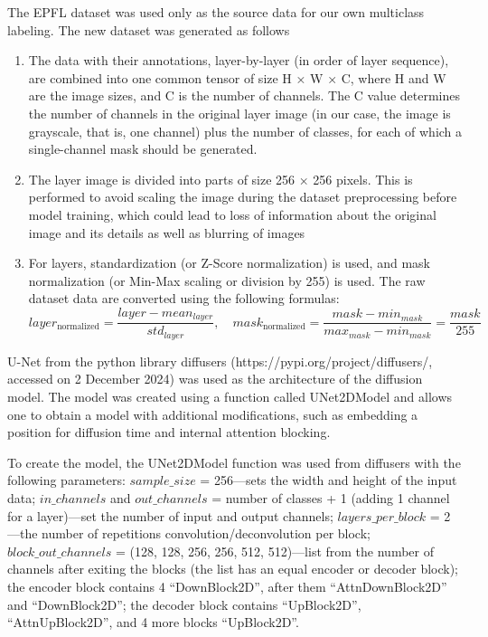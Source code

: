 \documentclass[journal,article,submit,pdftex,moreauthors]{Definitions/mdpi}
\begin{document}
The EPFL dataset was used only as the source data for our own multiclass labeling. The new dataset was generated as follows
\begin{enumerate}
	\item {The data with their annotations, layer-by-layer (in order of layer sequence), are
	combined into one common tensor of size H × W × C, where H and W are the image
	sizes, and C is the number of channels. The C value determines the number of
	channels in the original layer image (in our case, the image is grayscale, that is, one
	channel) plus the number of classes, for each of which a single-channel mask should
	be generated.} 
	\item {The layer image is divided into parts of size 256 × 256 pixels. This is performed
	to avoid scaling the image during the dataset preprocessing before model training,
	which could lead to loss of information about the original image and its details as
	well as blurring of images}
	\item	{For layers, standardization (or Z-Score normalization) is used, and mask normalization (or Min-Max scaling or division by 255) is used. The raw dataset data are
	converted using the following formulas:
	\begin{equation}
		layer_{\text{normalized}} = \frac{layer - mean_{layer}}{std_{layer}}, \quad
    mask_{\text{normalized}} = \frac{mask - min_{mask}}{max_{mask} - min_{mask}} = \frac{mask}{255}
    \tag{4}
	\end{equation}
	}
\end{enumerate}

U-Net from the python library diffusers (https://pypi.org/project/diffusers/, accessed on 2 December 2024) was used as the architecture of the diffusion model. The model was created using a function called UNet2DModel and allows one to obtain a model with additional modifications, such as embedding a position for diffusion time and internal attention blocking.

To create the model, the UNet2DModel function was used from diffusers with the following parameters: $sample\_size$ = 256—sets the width and height of the input data; $in\_channels$ and $out\_channels$ = number of classes + 1 (adding 1 channel for a layer)—set the number of input and output channels; $layers\_per\_block$ = 2—the number of repetitions convolution/deconvolution per block; $block\_out\_channels$ = (128, 128, 256, 256, 512, 512)—list from the number of channels after exiting the blocks (the list has an equal encoder or decoder block); the encoder block contains 4 “DownBlock2D”, after them “AttnDownBlock2D” and “DownBlock2D”; the decoder block contains “UpBlock2D”, “AttnUpBlock2D”, and 4 more blocks “UpBlock2D”.
\end{document}

